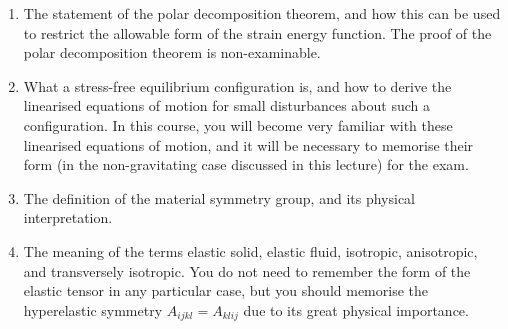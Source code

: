\begin{enumerate}
    \item[(i)] The statement of the polar decomposition theorem, and how this can be used to restrict the allowable form of the strain energy function. The proof of the polar decomposition theorem is non-examinable.
    \item[(ii)] What a stress-free equilibrium configuration is, and how to derive the linearised equations of motion for small disturbances about such a configuration. In this course, you will become very familiar with these linearised equations of motion, and it will be necessary to memorise their form (in the non-gravitating case discussed in this lecture) for the exam.
    \item[(iii)] The definition of the material symmetry group, and its physical interpretation.
    \item[(iv)] The meaning of the terms elastic solid, elastic fluid, isotropic, anisotropic, and transversely isotropic. You do not need to remember the form of the elastic tensor in any particular case, but you should memorise the hyperelastic symmetry $A_{ijkl} = A_{klij}$ due to its great physical importance.
\end{enumerate}
